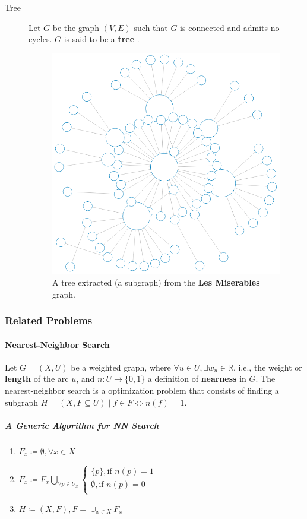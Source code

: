 \documentclass[12pt]{article}
\begin{document}
\begin{description}
	\item[Tree] Let $G$ be the graph $(V, E)$ such that $G$ is connected and admits no cycles. $G$ is  said to be a \textbf{tree} \cite{berge1973}.

	\begin{figure}[H]
		\centering
		\includegraphics[width=.4\linewidth]{tree}
		\captionsetup{justification=centering}
		\caption{A tree extracted (a subgraph) from the \textbf{Les Miserables} graph.}
		\label{tree}
	\end{figure}
\end{description}

\subsubsection{Related Problems}

\paragraph{Nearest-Neighbor Search}

Let $G = (X, U)$ be a weighted graph, where $ \forall u \in U, \exists w_u \in \mathbb{R}$, i.e., the weight or \textbf{length} of the arc $u$, and $n\colon U \to \{0, 1\}$ a definition of \textbf{nearness} in $G$. The nearest-neighbor search is a optimization problem that consists of finding a subgraph $H = (X, F \subseteq U) \mid f \in F \iff n(f) = 1$.

\subparagraph{A Generic Algorithm for NN Search}
\begin{enumerate}
	\item $F_x \coloneqq \emptyset, \forall x \in X$
	\item $F_x \coloneqq F_x \bigcup_{\forall p \in U_x} \begin{cases}
	\{p\}, \text{if } n(p) = 1 \\
	\emptyset, \text{if } n(p) = 0 \\
	\end{cases}$
	\item $H \coloneqq (X, F), F = \cup_{x\in X} F_x$
\end{enumerate}
\end{document}
